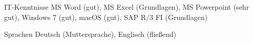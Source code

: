 

\begin{cvskills}

  \cvskill
    {IT-Kenntnisse} %
    {MS Word (gut), MS Excel (Grundlagen), MS Powerpoint (sehr gut), Windows 7 (gut), macOS (gut), SAP R/3 FI (Grundlagen)} %


  \cvskill
    {Sprachen} %
    {Deutsch (Muttersprache), Englisch (fließend)} %
    

\end{cvskills}
